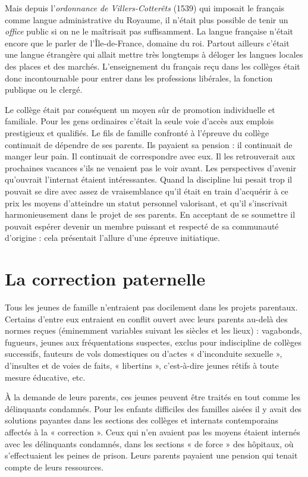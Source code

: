  Mais depuis l'\emph{ordonnance de Villers-Cotterêts} (1539) qui imposait le français comme langue administrative du Royaume, il n'était plus possible de tenir un \emph{office} public si on ne le maîtrisait pas suffisamment. La langue française n'était encore que le parler de l'Île-de-France, domaine du roi. Partout ailleurs c'était une langue étrangère qui allait mettre très longtemps à déloger les langues locales des places et des marchés. L'enseignement du français reçu dans les collèges était donc incontournable pour entrer dans les professions libérales, la fonction publique ou le clergé. 

 Le collège était par conséquent un moyen sûr de promotion individuelle et familiale. Pour les gens ordinaires c'était la seule voie d'accès aux emplois prestigieux et qualifiés. Le fils de famille confronté à l'épreuve du collège continuait de dépendre de ses parents. Ils payaient sa pension : il continuait de manger leur pain. Il continuait de correspondre avec eux. Il les retrouverait aux prochaines vacances s'ils ne venaient pas le voir avant. Les perspectives d'avenir qu'ouvrait l'internat étaient intéressantes. Quand la discipline lui pesait trop il pouvait se dire avec assez de vraisemblance qu'il était en train d'acquérir à ce prix les moyens d'atteindre un statut personnel valorisant, et qu'il s'inscrivait harmonieusement dans le projet de ses parents. En acceptant de se soumettre il pouvait espérer devenir un membre puissant et respecté de sa communauté d'origine : cela présentait l'allure d'une épreuve initiatique. 

\section{La correction paternelle}

 Tous les jeunes de famille n'entraient pas docilement dans les projets parentaux. Certains d'entre eux entraient en conflit ouvert avec leurs parents au-delà des normes reçues (éminemment variables suivant les siècles et les lieux) : vagabonds, fugueurs, jeunes aux fréquentations suspectes, exclus pour indiscipline de collèges successifs, fauteurs de vols domestiques ou d'actes « d'inconduite sexuelle », d'insultes et de voies de faits, « libertins », c'est-à-dire jeunes rétifs à toute mesure éducative, etc. 

 À la demande de leurs parents, ces jeunes peuvent être traités en tout comme les délinquants condamnés. Pour les enfants difficiles des familles aisées il y avait des solutions payantes dans les sections des collèges et internats contemporains affectés à la « correction ». Ceux qui n'en avaient pas les moyens étaient internés avec les délinquants condamnés, dans les sections « de force » des hôpitaux, où s'effectuaient les peines de prison. Leurs parents payaient une pension qui tenait compte de leurs ressources. 

